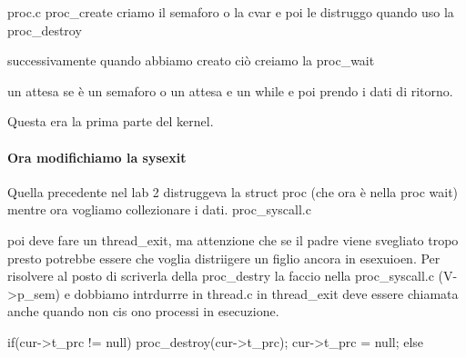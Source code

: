proc.c proc\_create criamo il semaforo o la cvar e poi le distruggo
quando uso la proc\_destroy

successivamente quando abbiamo creato ciò creiamo la proc\_wait

un attesa se è un semaforo o un attesa e un while  e poi
prendo i dati di ritorno.

Questa era la prima parte del kernel.

\paragraph{Ora modifichiamo la sysexit}
Quella precedente nel lab 2 distruggeva la struct proc (che ora è nella proc
wait) mentre ora vogliamo collezionare i dati.
proc\_syscall.c

poi deve fare un thread\_exit, ma attenzione che
se il padre viene svegliato tropo presto potrebbe essere
che voglia distriigere un figlio ancora in esexuioen.
Per risolvere al posto di scriverla della proc\_destry la faccio nella
proc\_syscall.c (V->p\_sem) e dobbiamo intrdurrre in thread.c in thread\_exit
deve essere chiamata anche quando non cis ono processi in esecuzione.


if(cur->t\_prc != null) {
    proc\_destroy(cur->t\_prc);
    cur->t\_prc = null;
  }else{

  }







